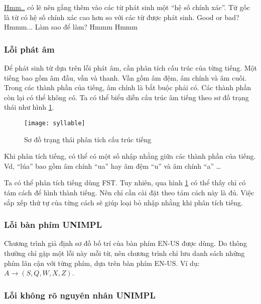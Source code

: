 \documentclass[a4paper,oneside]{book} %
\newcommand{\note}[1]{\underline{#1}}
\begin{document}
\note{Hmm..} có lẽ nên gắng thêm vào các từ phát sinh một ``hệ số chính
xác''. Từ gốc là từ có hệ số chính xác cao hơn so với các từ được phát
sinh. Good or bad? Hmmm... Làm sao để làm? Hmmm Hmmm

\subsubsection{Lỗi phát âm}

Để phát sinh từ dựa trên lỗi phát âm, cần phân tích cấu trúc của từng
tiếng. Một tiếng bao gồm âm đầu, vần và thanh. Vần gồm âm đệm, âm
chính và âm cuối. Trong các thành phần của tiếng, âm chính là bắt buộc
phải có. Các thành phần còn lại có thể không có. Ta có thể biểu diễn
cấu trúc âm tiếng theo sơ đồ trạng thái như hình \ref{fig:syllable}.

\begin{figure}[htbp]
  \centering
  \texttt{[image: syllable]}
  \caption{Sơ đồ trạng thái phân tích cấu trúc tiếng}
  \label{fig:syllable}
\end{figure}

Khi phân tích tiếng, có thể có một số nhập nhằng giữa các thành phần
của tiếng. Vd, ``lúa'' bao gồm âm chính ``ua'' hay âm đệm ``u'' và âm
chính ``a'' \ldots

Ta có thể phân tích tiếng dùng FST. Tuy nhiên, qua hình
\ref{fig:syllable} có thể thấy chỉ có tám cách để hình thành
tiếng. Nên chỉ cần cài đặt theo tám cách này là đủ. Việc sắp xếp thứ
tự của từng cách sẽ giúp loại bỏ nhập nhằng khi phân tích tiếng.

\subsubsection{Lỗi bàn phím UNIMPL}

Chương trình giả định sơ đồ bố trí của bàn phím EN-US được dùng. Do
thông thường chỉ gặp một lỗi này mỗi từ, nên chương trình chỉ lưu danh
sách những phím lân cận với từng phím, dựa trên bàn phím EN-US. Ví dụ:
$A \rightarrow (S,Q,W,X,Z)$. 

\subsubsection{Lỗi không rõ nguyên nhân UNIMPL}
\end{document}
